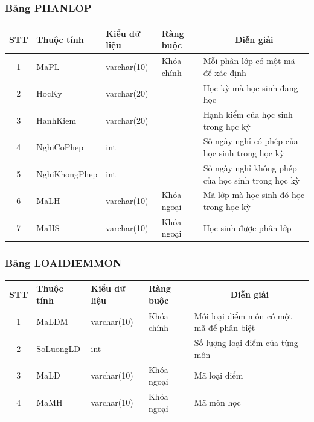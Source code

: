 \documentclass[a4paper]{article}
\begin{document}
\subsubsection{Bảng PHANLOP}
\begin{table}[H]
\centering
\renewcommand{\arraystretch}{1.5}
\setlength{\tabcolsep}{12pt}
\begin{tabular}{|c|l|l|l|p{5cm}|}
\hline
\textbf{STT} & \textbf{Thuộc tính} & \textbf{Kiểu dữ liệu} & \textbf{Ràng buộc} & \multicolumn{1}{|c|}{\textbf{Diễn giải}} \\
\hline
1 & MaPL & varchar(10) & Khóa chính & Mỗi phân lớp có một mã để xác định \\
\hline
2 & HocKy & varchar(20) &  & Học kỳ mà học sinh đang học \\
\hline 
3 & HanhKiem & varchar(20) & & Hạnh kiểm của học sinh trong học kỳ \\
\hline 
4 & NghiCoPhep & int & & Số ngày nghỉ có phép của học sinh trong học kỳ \\
\hline
5 & NghiKhongPhep & int & & Số ngày nghỉ không phép của học sinh trong học kỳ \\ 
\hline
6 & MaLH & varchar(10) & Khóa ngoại & Mã lớp mà học sinh đó học trong học kỳ \\
\hline
7 & MaHS & varchar(10) & Khóa ngoại & Học sinh được phân lớp \\
\hline

\end{tabular}
\end{table}


\subsubsection{Bảng LOAIDIEMMON}
\begin{table}[H]
\centering
\renewcommand{\arraystretch}{1.5}
\setlength{\tabcolsep}{12pt}
\begin{tabular}{|c|l|l|l|p{5cm}|}
\hline
\textbf{STT} & \textbf{Thuộc tính} & \textbf{Kiểu dữ liệu} & \textbf{Ràng buộc} & \multicolumn{1}{|c|}{\textbf{Diễn giải}} \\
\hline
1 & MaLDM & varchar(10) & Khóa chính & Mỗi loại điểm môn có một mã để phân biệt  \\
\hline
2 & SoLuongLD & int & & Số lượng loại điểm của từng môn \\
\hline
3 & MaLD & varchar(10) & Khóa ngoại & Mã loại điểm \\
\hline
4 & MaMH & varchar(10) & Khóa ngoại & Mã môn học \\
\hline
\end{tabular}
\end{table}
\end{document}
